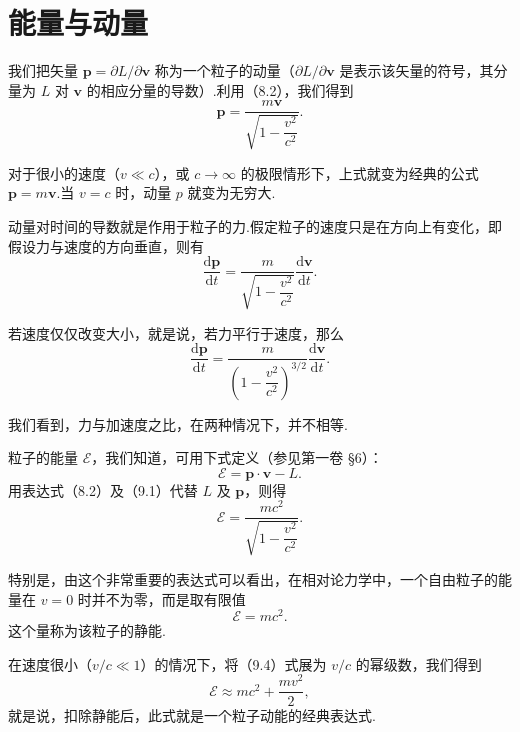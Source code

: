 \section{能量与动量}

我们把矢量 $\boldsymbol{p}=\partial L/\partial\boldsymbol{v}$ 称为一个粒子的动量（$\partial L/\partial\boldsymbol{v}$ 是表示该矢量的符号，其分量为 $L$ 对 $\boldsymbol{v}$ 的相应分量的导数）.利用（8.2），我们得到
\begin{equation}
  \boldsymbol{p}=\frac{m\boldsymbol{v}}{\sqrt{1-\dfrac{v^2}{c^2}}}.
\end{equation}

对于很小的速度（$v\ll c$），或 $c\to\infty$ 的极限情形下，上式就变为经典的公式 $\boldsymbol{p}=m\boldsymbol{v}$.当 $v=c$ 时，动量 $p$ 就变为无穷大.

动量对时间的导数就是作用于粒子的力.假定粒子的速度只是在方向上有变化，即假设力与速度的方向垂直，则有
\begin{equation}
  \frac{\mathrm{d}\boldsymbol{p}}{\mathrm{d}t}
  =\frac{m}{\sqrt{1-\dfrac{v^2}{c^2}}}\frac{\mathrm{d}\boldsymbol{v}}{\mathrm{d}t}.
\end{equation}

若速度仅仅改变大小，就是说，若力平行于速度，那么
\begin{equation}
  \frac{\mathrm{d}\boldsymbol{p}}{\mathrm{d}t}
  =\frac{m}{\left(1-\dfrac{v^2}{c^2}\right)^{3/2}}
  \frac{\mathrm{d}\boldsymbol{v}}{\mathrm{d}t}.
\end{equation}

我们看到，力与加速度之比，在两种情况下，并不相等.

粒子的能量 $\mathcal{E}$，我们知道，可用下式定义（参见第一卷 §6）：
\begin{equation*}
  \mathcal{E}=\boldsymbol{p}\cdot\boldsymbol{v}-L.
\end{equation*}
用表达式（8.2）及（9.1）代替 $L$ 及 $\boldsymbol{p}$，则得
\begin{equation}
  \mathcal{E}=\frac{mc^2}{\sqrt{1-\dfrac{v^2}{c^2}}}.
\end{equation}

特别是，由这个非常重要的表达式可以看出，在相对论力学中，一个自由粒子的能量在 $v=0$ 时并不为零，而是取有限值
\begin{equation}
  \mathcal{E}=mc^2.
\end{equation}
这个量称为该粒子的静能.

在速度很小（$v/c\ll1$）的情况下，将（9.4）式展为 $v/c$ 的幂级数，我们得到
\begin{equation*}
  \mathcal{E}\approx mc^2+\frac{mv^2}{2},
\end{equation*}
就是说，扣除静能后，此式就是一个粒子动能的经典表达式.

